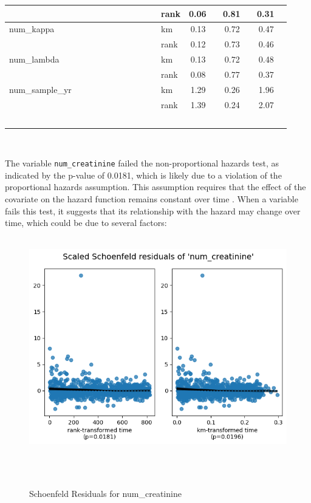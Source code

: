 \begin{table}[H]
\begin{tabular}{|l|l|c|c|c|}
                                    & rank & 0.06  & 0.81   & 0.31  \\ \hline
 num\_kappa                       & km   & 0.13  & 0.72   & 0.47  \\ \hline
                                    & rank & 0.12  & 0.73   & 0.46  \\ \hline
 num\_lambda                      & km   & 0.13  & 0.72   & 0.48  \\ \hline
                                    & rank & 0.08  & 0.77   & 0.37  \\ \hline
 num\_sample\_yr                  & km   & 1.29  & 0.26   & 1.96  \\ \hline
                                    & rank & 1.39  & 0.24   & 2.07  \\ \hline
    \end{tabular}
    \end{table}

\noindent The variable \texttt{num\_creatinine} failed the non-proportional hazards test, as indicated by the p-value of 0.0181, which is likely due to a violation of the proportional hazards assumption. This assumption requires that the effect of the covariate on the hazard function remains constant over time \parencite{kalbfleisch_fifty_2023}. When a variable fails this test, it suggests that its relationship with the hazard may change over time, which could be due to several factors:

\begin{figure}[h]
    \centering
    \includegraphics[width=\linewidth]{Figures/SURV/schoen1.png}
    \caption{Schoenfeld Residuals for num\_creatinine}
    \label{fig:your_label}
\end{figure}

